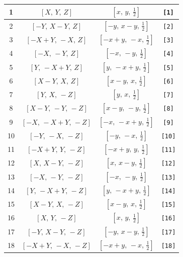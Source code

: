 \documentclass[fleqn,8pt]{jsarticle}
\begin{document}
\begin{longtable}{cccc}
1 & $\left[ X,\, Y,\, Z \right]$ & $\left[ x,\, y,\, \frac{1}{2} \right]$ & {\tt [1]} \\ \hline
2 & $\left[ - Y,\, X - Y,\, Z \right]$ & $\left[ - y,\, x - y,\, \frac{1}{2} \right]$ & {\tt [2]} \\ \hline
3 & $\left[ - X + Y,\, - X,\, Z \right]$ & $\left[ - x + y,\, - x,\, \frac{1}{2} \right]$ & {\tt [3]} \\ \hline
4 & $\left[ - X,\, - Y,\, Z \right]$ & $\left[ - x,\, - y,\, \frac{1}{2} \right]$ & {\tt [4]} \\ \hline
5 & $\left[ Y,\, - X + Y,\, Z \right]$ & $\left[ y,\, - x + y,\, \frac{1}{2} \right]$ & {\tt [5]} \\ \hline
6 & $\left[ X - Y,\, X,\, Z \right]$ & $\left[ x - y,\, x,\, \frac{1}{2} \right]$ & {\tt [6]} \\ \hline
7 & $\left[ Y,\, X,\, - Z \right]$ & $\left[ y,\, x,\, \frac{1}{2} \right]$ & {\tt [7]} \\ \hline
8 & $\left[ X - Y,\, - Y,\, - Z \right]$ & $\left[ x - y,\, - y,\, \frac{1}{2} \right]$ & {\tt [8]} \\ \hline
9 & $\left[ - X,\, - X + Y,\, - Z \right]$ & $\left[ - x,\, - x + y,\, \frac{1}{2} \right]$ & {\tt [9]} \\ \hline
10 & $\left[ - Y,\, - X,\, - Z \right]$ & $\left[ - y,\, - x,\, \frac{1}{2} \right]$ & {\tt [10]} \\ \hline
11 & $\left[ - X + Y,\, Y,\, - Z \right]$ & $\left[ - x + y,\, y,\, \frac{1}{2} \right]$ & {\tt [11]} \\ \hline
12 & $\left[ X,\, X - Y,\, - Z \right]$ & $\left[ x,\, x - y,\, \frac{1}{2} \right]$ & {\tt [12]} \\ \hline
13 & $\left[ - X,\, - Y,\, - Z \right]$ & $\left[ - x,\, - y,\, \frac{1}{2} \right]$ & {\tt [13]} \\ \hline
14 & $\left[ Y,\, - X + Y,\, - Z \right]$ & $\left[ y,\, - x + y,\, \frac{1}{2} \right]$ & {\tt [14]} \\ \hline
15 & $\left[ X - Y,\, X,\, - Z \right]$ & $\left[ x - y,\, x,\, \frac{1}{2} \right]$ & {\tt [15]} \\ \hline
16 & $\left[ X,\, Y,\, - Z \right]$ & $\left[ x,\, y,\, \frac{1}{2} \right]$ & {\tt [16]} \\ \hline
17 & $\left[ - Y,\, X - Y,\, - Z \right]$ & $\left[ - y,\, x - y,\, \frac{1}{2} \right]$ & {\tt [17]} \\ \hline
18 & $\left[ - X + Y,\, - X,\, - Z \right]$ & $\left[ - x + y,\, - x,\, \frac{1}{2} \right]$ & {\tt [18]} \\ \hline

\end{longtable}
\end{document}

